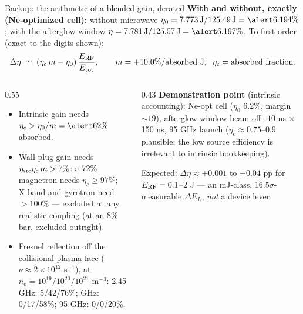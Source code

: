 \documentclass[aspectratio=169,10pt]{beamer}
\newcommand{\bad}[1]{\textcolor{badred}{#1}}
\begin{document}
\begin{frame}{Backup: the arithmetic of a blended gain, derated}
\textbf{With and without, exactly (Ne-optimized cell):} without
microwave $\eta_0 = 7.773\,\mathrm{J}/125.49\,\mathrm{J} =
\alert{6.194\%}$; with the afterglow window $\eta =
7.781\,\mathrm{J}/125.57\,\mathrm{J} = \alert{6.197\%}$.
To first order (exact to the digits shown):
\[
  \Delta\eta \;\simeq\; (\eta_c\, m - \eta_0)\,
  \frac{E_{\rm RF}}{E_{\rm tot}},
  \qquad m = +10.0\%/\text{absorbed J},\;\; \eta_c = \text{absorbed
  fraction.}
\]
\vspace{-1.5ex}
\begin{columns}[T]
\begin{column}{0.55\textwidth}
\small
\begin{itemize}
  \item Intrinsic gain needs $\eta_c > \eta_0/m = \alert{62\%}$
        absorbed.
  \item Wall-plug gain needs $\eta_{\rm src}\eta_c\, m > 7\%$: a 72\%
        magnetron needs $\eta_c \ge 97\%$; X-band and gyrotron need
        $>100\%$ --- \bad{excluded at any realistic coupling} (at an
        8\% bar, excluded outright).
  \item Fresnel reflection off the collisional plasma face
        ($\nu \approx 2\times10^{12}$ s$^{-1}$), at
        $n_e = 10^{19}/10^{20}/10^{21}$ m$^{-3}$:
        2.45 GHz: 5/42/76\%;  GHz: 0/17/58\%; \;
        \alert{95 GHz: 0/0/20\%}.
\end{itemize}
\end{column}
\begin{column}{0.43\textwidth}
\small
\textbf{Demonstration point} (intrinsic accounting):
Ne-opt cell ($\eta_0$ 6.2\%, margin ${\sim}19$), afterglow window
beam-off$+10$ ns $\times$ 150 ns, \alert{95 GHz} launch
($\eta_c \approx 0.75$--$0.9$ plausible; the low source efficiency is
irrelevant to intrinsic bookkeeping).
\smallskip

Expected: $\Delta\eta \approx +0.001$ to $+0.04$ pp for
$E_{\rm RF} = 0.1$--$2$ J --- an mJ-class, $16.5\sigma$-measurable
$\Delta E_L$, \emph{not} a device lever.
\end{column}
\end{columns}
\end{frame}
\end{document}
